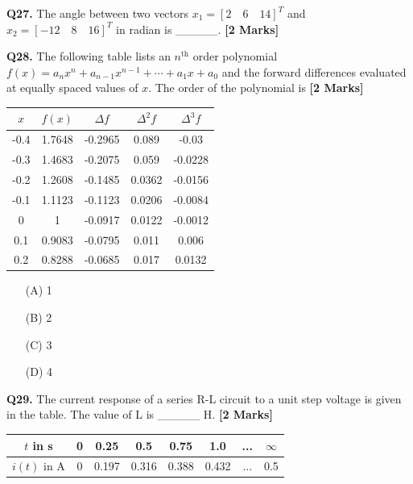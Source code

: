 \documentclass[11pt]{article}
\newcommand{\questionb}[2]{
    \noindent\textbf{Q#2.} #1 \hfill \textbf{[2 Marks]}
}
\begin{document}
\questionb{The angle between two vectors \( x_1 = [2 \quad 6 \quad 14]^T \) and \( x_2 = [-12 \quad 8 \quad 16]^T \) in radian is \_\_\_\_\_.}{27}
\vspace{0.5cm}

\questionb{The following table lists an \( n^{\text{th}} \) order polynomial \( f(x) = a_nx^n + a_{n-1}x^{n-1} + \cdots + a_1x + a_0 \) and the forward differences evaluated at equally spaced values of \( x \). The order of the polynomial is}{28}
\begin{center}
\begin{tabular}{|c|c|c|c|c|}
\hline
\( x \) & \( f(x) \) & \( \Delta f \) & \( \Delta^2 f \) & \( \Delta^3 f \) \\ \hline
-0.4 & 1.7648 & -0.2965 & 0.089 & -0.03 \\ \hline
-0.3 & 1.4683 & -0.2075 & 0.059 & -0.0228 \\ \hline
-0.2 & 1.2608 & -0.1485 & 0.0362 & -0.0156 \\ \hline
-0.1 & 1.1123 & -0.1123 & 0.0206 & -0.0084 \\ \hline
0 & 1 & -0.0917 & 0.0122 & -0.0012 \\ \hline
0.1 & 0.9083 & -0.0795 & 0.011 & 0.006 \\ \hline
0.2 & 0.8288 & -0.0685 & 0.017 & 0.0132 \\ \hline
\end{tabular}
\end{center}
\begin{enumerate}
    \item[(A)] 1  
    \item[(B)] 2  
    \item[(C)] 3  
    \item[(D)] 4  
\end{enumerate}
\vspace{0.5cm}

\questionb{The current response of a series R-L circuit to a unit step voltage is given in the table. The value of L is \_\_\_\_\_ H.}{29}
\begin{center}
\begin{tabular}{|c|c|c|c|c|c|c|c|}
\hline
\( t \) in s & 0 & 0.25 & 0.5 & 0.75 & 1.0 & ... & \(\infty\) \\ \hline
\( i(t) \) in A & 0 & 0.197 & 0.316 & 0.388 & 0.432 & ... & 0.5 \\ \hline
\end{tabular}
\end{center}
\vspace{0.5cm}
\end{document}
